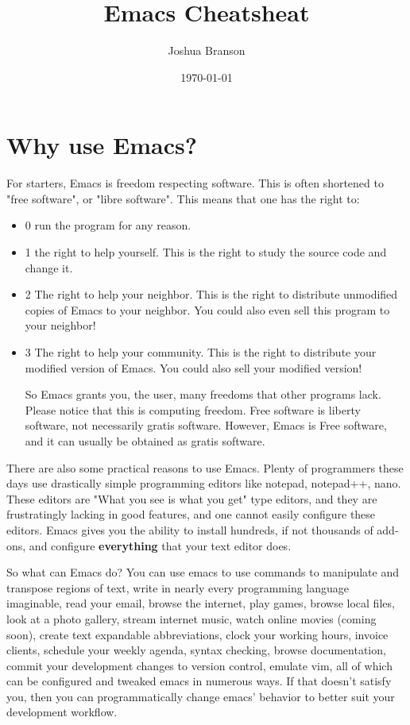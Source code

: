 \documentclass[11pt]{article}
\author{Joshua Branson}
\date{\today}
\title{Emacs Cheatsheat}
\begin{document}
\maketitle

\section{Why use Emacs?}
\label{sec:orgheadline1}

For starters, Emacs is freedom respecting software.  This is often shortened to "free software", or "libre software".  This means that one has the right to:
\begin{itemize}
\item 0 run the program for any reason.
\item 1 the right to help yourself.
This is the right to study the source code and change it.
\item 2 The right to help your neighbor.
This is the right to distribute unmodified copies of Emacs to your neighbor.  You could also even sell this program to your neighbor!
\item 3 The right to help your community.
This is the right to distribute your modified version of Emacs.  You could also sell your modified version!

So Emacs grants you, the user, many freedoms that other programs lack.  Please notice that this is computing freedom.  Free software is liberty software, not necessarily gratis software.  However,  Emacs is Free software, and it can usually be obtained as gratis software.
\end{itemize}

There are also some practical reasons to use Emacs. Plenty of programmers these days use drastically simple programming editors like notepad, notepad++, nano.  These editors are "What you see is what you get" type editors, and they are frustratingly lacking in good features, and one cannot easily configure these editors.  Emacs gives you the ability to install hundreds, if not thousands of add-ons, and configure \textbf{everything} that your text editor does.

So what can Emacs do?  You can use emacs to use commands to manipulate and transpose regions of text, write in nearly every programming language imaginable, read your email, browse the internet, play games, browse local files, look at a photo gallery, stream internet music, watch online movies (coming soon), create text expandable abbreviations, clock your working hours, invoice clients, schedule your weekly agenda, syntax checking, browse documentation, commit your development changes to version control, emulate vim, all of which can be configured and tweaked emacs in numerous ways.  If that doesn't satisfy you, then you can programmatically change emacs' behavior to better suit your development workflow.
\end{document}
